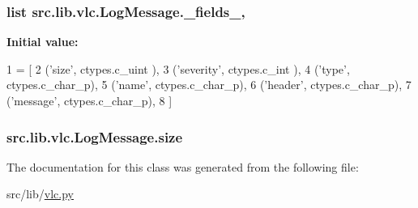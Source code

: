\subsubsection[{\+\_\+fields\+\_\+}]{\setlength{\rightskip}{0pt plus 5cm}list src.\+lib.\+vlc.\+Log\+Message.\+\_\+fields\+\_\+\hspace{0.3cm}{\ttfamily [static]}, {\ttfamily [private]}}\label{classsrc_1_1lib_1_1vlc_1_1LogMessage_a030acfe26d6f47b2c5cda7e4a9f3c2eb}
{\bfseries Initial value\+:}
\begin{DoxyCode}
1 = [
2         (\textcolor{stringliteral}{'size'},     ctypes.c\_uint  ),
3         (\textcolor{stringliteral}{'severity'}, ctypes.c\_int   ),
4         (\textcolor{stringliteral}{'type'},     ctypes.c\_char\_p),
5         (\textcolor{stringliteral}{'name'},     ctypes.c\_char\_p),
6         (\textcolor{stringliteral}{'header'},   ctypes.c\_char\_p),
7         (\textcolor{stringliteral}{'message'},  ctypes.c\_char\_p),
8     ]
\end{DoxyCode}
\hypertarget{classsrc_1_1lib_1_1vlc_1_1LogMessage_a1be1cdb16716541b9a5a19a26072fe79}{}
\subsubsection[{size}]{\setlength{\rightskip}{0pt plus 5cm}src.\+lib.\+vlc.\+Log\+Message.\+size}\label{classsrc_1_1lib_1_1vlc_1_1LogMessage_a1be1cdb16716541b9a5a19a26072fe79}


The documentation for this class was generated from the following file\+:\begin{DoxyCompactItemize}
\item 
src/lib/\hyperlink{vlc_8py}{vlc.\+py}\end{DoxyCompactItemize}

